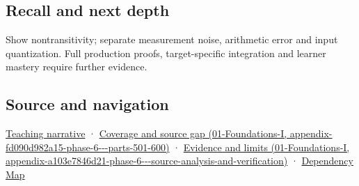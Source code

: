 \subsection{Recall and next depth}\label{appendix-b5b83329215b-recall-and-next-depth}

Show nontransitivity; separate measurement noise, arithmetic error and input quantization. Full production proofs, target-specific integration and learner mastery require further evidence.

\subsection{Source and navigation}\label{appendix-b5b83329215b-source-and-navigation}

\hyperref[02-foundations-ii-ch037-reliability-begins-at-the-boundary-of-the-calculation]{Teaching narrative} · \href{../01-Foundations-I/main.pdf\#nameddest=appendix-fd090d982a15-phase-6---parts-501-600}{Coverage and source gap (01-Foundations-I, appendix-fd090d982a15-phase-6-\/-\/-parts-501-600)} · \href{../01-Foundations-I/main.pdf\#nameddest=appendix-a103e7846d21-phase-6---source-analysis-and-verification}{Evidence and limits (01-Foundations-I, appendix-a103e7846d21-phase-6-\/-\/-source-analysis-and-verification)} · \hyperref[appendix-4ad47bdd269a]{Dependency Map}
